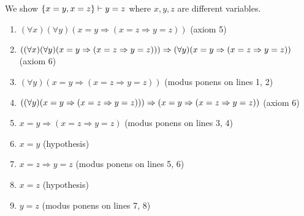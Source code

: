 \begin{example}
    We show \( \qty{x = y, x = z} \vdash y = z \) where \( x, y, z \) are different variables.
    \begin{enumerate}[1.]
        \item \( (\forall x)(\forall y)(x = y \Rightarrow (x = z \Rightarrow y = z)) \) (axiom 5)
        \item \( \qty((\forall x)(\forall y)(x = y \Rightarrow (x = z \Rightarrow y = z))) \Rightarrow (\forall y)(x = y \Rightarrow (x = z \Rightarrow y = z)) \) (axiom 6)
        \item \( (\forall y)(x = y \Rightarrow (x = z \Rightarrow y = z)) \) (modus ponens on lines 1, 2)
        \item \( \qty((\forall y)(x = y \Rightarrow (x = z \Rightarrow y = z))) \Rightarrow (x = y \Rightarrow (x = z \Rightarrow y = z)) \) (axiom 6)
        \item \( x = y \Rightarrow (x = z \Rightarrow y = z) \) (modus ponens on lines 3, 4)
        \item \( x = y \) (hypothesis)
        \item \( x = z \Rightarrow y = z \) (modus ponens on lines 5, 6)
        \item \( x = z \) (hypothesis)
        \item \( y = z \) (modus ponens on lines 7, 8)
    \end{enumerate}
\end{example}

